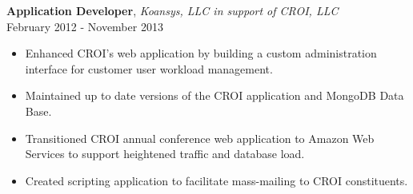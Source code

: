 \documentclass[margin,line,10pt]{resume}
\begin{document}
\begin{resume}
\textbf{Application Developer}, \textsl{Koansys, LLC in support of CROI, LLC}\\February 2012 - November 2013\vspace{2mm}%
\begin{itemize}
    \item Enhanced CROI’s web application by building a custom administration interface for customer user workload management.  
    \item Maintained up to date versions of the CROI application and MongoDB Data Base. 
    \item Transitioned CROI annual conference web application to Amazon Web Services  to support heightened traffic and database load. 
    \item Created scripting application to facilitate mass-mailing to CROI constituents.
\end{itemize}

\pagebreak


\end{resume}
\end{document}
